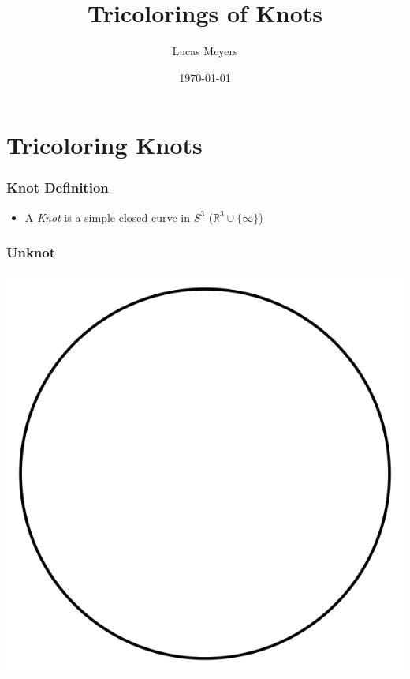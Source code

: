 \documentclass{beamer}
\title{Tricolorings of Knots}
\author{Lucas Meyers}
\institute[Louisiana State University] %
{Department of Mathematics\\
Louisiana State University}
\date[Short Occasion] %
{\today}
\begin{document}
\begin{frame}
  \titlepage
\end{frame}

\section{Tricoloring Knots}

\begin{frame}
  \frametitle{Knot Definition}
  \begin{itemize}
  \item A \textit{Knot} is a simple closed curve in $S^3$ ($\mathbb{R}^3\cup \{\infty\}$)
  \end{itemize}
\end{frame}

\begin{frame}
  \frametitle{Unknot}
  \begin{center}
    \includegraphics[scale=.4]{unknot}  
  \end{center}
\end{frame}
\end{document}
